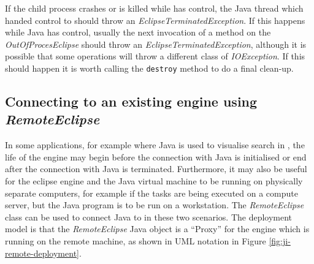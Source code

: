If the child process {\eclipse} crashes or is killed while {\eclipse}
has control, the Java thread which handed control to {\eclipse} should
throw an {\it EclipseTerminatedException}. If this happens while Java
has control, usually the next invocation of a method on the {\it
OutOfProcesEclipse} should throw an {\it EclipseTerminatedException},
although it is possible that some operations will throw a different
class of {\it IOException}. If this should happen it is worth calling
the {\tt destroy} method to do a final clean-up.

\subsection{Connecting to an existing {\eclipse} engine using {\it RemoteEclipse}}
\label{sec:ji-connecting-existing}

In some applications, for example where Java is used to visualise
search in {\eclipse}, the life of the {\eclipse} engine may begin
before the connection with Java is initialised or end after the
connection with Java is terminated. Furthermore, it may also be useful
for the eclipse engine and the Java virtual machine to be running on
physically separate computers, for example if the {\eclipse} tasks are
being executed on a compute server, but the Java program is to be run
on a workstation. The {\it RemoteEclipse} class can be used to connect
Java to {\eclipse} in these two scenarios. The deployment model is
that the {\it RemoteEclipse} Java object is a ``Proxy'' for the
{\eclipse} engine which is running on the remote machine, as shown in
UML notation in Figure \ref{fig:ji-remote-deployment}.


